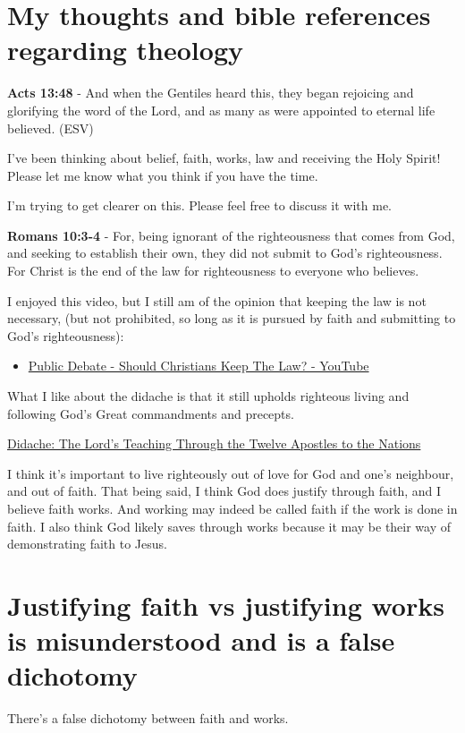 \documentclass[11pt]{article}
\author{root}
\date{\today}
\title{}
\begin{document}
\section{My thoughts and bible references regarding theology}
\label{sec:org8b01f7e}
\textbf{Acts 13:48} - And when the Gentiles heard this, they began rejoicing and glorifying the word of the Lord, and as many as were appointed to eternal life believed. (ESV)

I've been thinking about belief, faith, works, law and receiving the Holy Spirit!
Please let me know what you think if you have the time.

I'm trying to get clearer on this.
Please feel free to discuss it with me.

\textbf{Romans 10:3-4} - For, being ignorant of the righteousness that comes from God, and seeking to establish their own, they did not submit to God's righteousness. For Christ is the end of the law for righteousness to everyone who believes.

I enjoyed this video, but I still am of the opinion that keeping the law is not necessary, (but not prohibited, so long as it is pursued by faith and submitting to God's righteousness):
\begin{itemize}
\item \href{https://www.youtube.com/watch?v=CNHKqhwu6Bo}{Public Debate - Should Christians Keep The Law? - YouTube}
\end{itemize}

What I like about the didache is that it still upholds righteous living and following God's Great commandments and precepts.

\href{https://www.earlychristianwritings.com/text/didache-roberts.html}{Didache: The Lord's Teaching Through the Twelve Apostles to the Nations}

I think it's important to live righteously out of love for God and one's neighbour, and out of faith.
That being said, I think God does justify through faith, and I believe faith works. And working may indeed be called faith if the work is done in faith.
I also think God likely saves through works because it may be their way of demonstrating faith to Jesus.

\section{Justifying faith vs justifying works is misunderstood and is a false dichotomy}
\label{sec:org9b40735}
There's a false dichotomy between faith and works.
\end{document}
